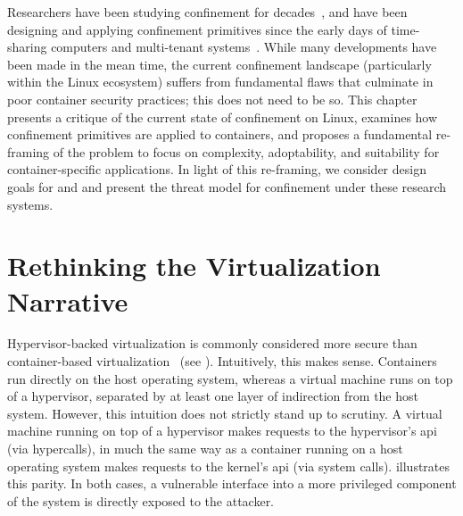 Researchers have been studying confinement for decades~\cite{lampson1973_confinement}, and
have been designing and applying confinement primitives since the early days of
time-sharing computers and multi-tenant systems~\cite{shu2016_security_isolation_study}.
While many developments have been made in the mean time, the current confinement landscape
(particularly within the Linux ecosystem) suffers from fundamental flaws that culminate in
poor container security practices; this does not need to be so. This chapter presents
a critique of the current state of confinement on Linux, examines how confinement
primitives are applied to containers, and proposes a fundamental re-framing of the problem
to focus on complexity, adoptability, and suitability for container-specific applications.
In light of this re-framing, we consider design goals for \bpfbox{} and \bpfcontain{} and
present the threat model for confinement under these research systems.

\section{Rethinking the Virtualization Narrative}%
\label{s:cp-rethinking}

Hypervisor-backed virtualization is commonly considered more secure than
con\-tain\-er-based virtualization~\cite{sultan2019_container_security,
eder2016_hypervisor_container} (see ). Intuitively, this
makes sense.  Containers run directly on the host operating system, whereas a virtual
machine runs on top of a hypervisor, separated by at least one layer of indirection from
the host system.  However, this intuition does not strictly stand up to scrutiny.
A virtual machine running on top of a hypervisor makes requests to the hypervisor's
\gls{api} (via hypercalls), in much the same way as a container running on a host
operating system makes requests to the kernel's \gls{api} (via system calls).
 illustrates this parity. In both cases, a vulnerable
interface into a more privileged component of the system is directly exposed to the
attacker.

